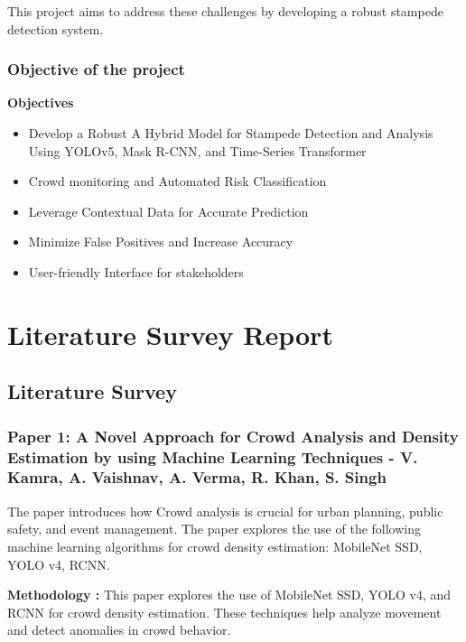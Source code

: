 \documentclass[11pt]{report}
\begin{document}
This project aims to address these challenges by developing a robust stampede detection system.
    
    \subsection{Objective of the project}
    \textbf{Objectives}
    \begin{itemize}
        \item Develop a Robust A Hybrid Model for Stampede Detection and Analysis Using YOLOv5, Mask R-CNN, and Time-Series Transformer
        \item Crowd monitoring and Automated Risk Classification
        \item Leverage Contextual Data for Accurate Prediction
        \item Minimize False Positives and Increase Accuracy
        \item User-friendly Interface for stakeholders
    \end{itemize}

\chapter{Literature Survey Report}



\section{Literature Survey}
\subsection{Paper 1: A Novel Approach for Crowd Analysis and Density Estimation by using Machine Learning Techniques - V. Kamra, A. Vaishnav, A. Verma, R. Khan, S. Singh}

The paper introduces how Crowd analysis is crucial for urban planning, public safety, and event management. The paper explores the use of the following machine learning algorithms for crowd density estimation: MobileNet SSD, YOLO v4, RCNN. \par
 
\textbf{Methodology : }  
This paper explores the use of MobileNet SSD, YOLO v4, and RCNN for crowd density estimation. These techniques help analyze movement and detect anomalies in crowd behavior. \\
\end{document}
